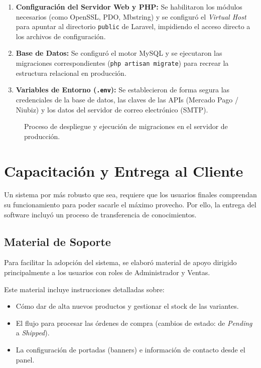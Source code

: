 \begin{enumerate}
    \item \textbf{Configuración del Servidor Web y PHP:} Se habilitaron los módulos necesarios (como OpenSSL, PDO, Mbstring) y se configuró el \textit{Virtual Host} para apuntar al directorio \texttt{public} de Laravel, impidiendo el acceso directo a los archivos de configuración.
    \item \textbf{Base de Datos:} Se configuró el motor MySQL y se ejecutaron las migraciones correspondientes (\texttt{php artisan migrate}) para recrear la estructura relacional en producción.
    \item \textbf{Variables de Entorno (\texttt{.env}):} Se establecieron de forma segura las credenciales de la base de datos, las claves de las APIs (Mercado Pago / Niubiz) y los datos del servidor de correo electrónico (SMTP).
\end{enumerate}

\begin{figure}[H]
    \centering
    \caption{Proceso de despliegue y ejecución de migraciones en el servidor de producción.}
    \label{fig:deploy_terminal}
\end{figure}

\section{Capacitación y Entrega al Cliente}

Un sistema por más robusto que sea, requiere que los usuarios finales comprendan su funcionamiento para poder sacarle el máximo provecho. Por ello, la entrega del software incluyó un proceso de transferencia de conocimientos.

\subsection{Material de Soporte}

Para facilitar la adopción del sistema, se elaboró material de apoyo dirigido principalmente a los usuarios con roles de Administrador y Ventas.

Este material incluye instrucciones detalladas sobre:
\begin{itemize}
    \item Cómo dar de alta nuevos productos y gestionar el stock de las variantes.
    \item El flujo para procesar las órdenes de compra (cambios de estado: de \textit{Pending} a \textit{Shipped}).
    \item La configuración de portadas (banners) e información de contacto desde el panel.
\end{itemize}

